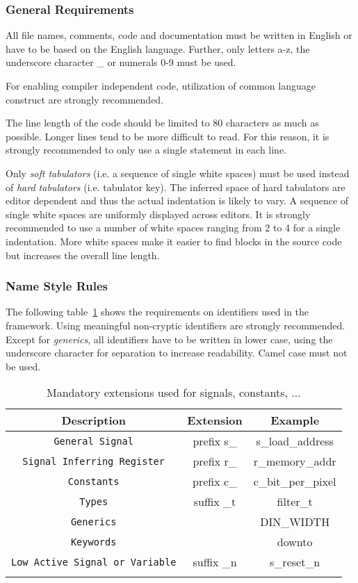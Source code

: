 \subsubsection{General Requirements}\label{VHDL-General-Requirements}
All file names, comments, code and documentation must be written in English or have to be based on the English language.
Further, only letters a-z, the underscore character \_ or numerals 0-9 must be used.

For enabling compiler independent code, utilization of common language construct are strongly recommended.


The line length of the code should be limited to 80 characters as much as possible.
Longer lines tend to be more difficult to read.
For this reason, it is strongly recommended to only use a single statement in each line.

Only \textit{soft tabulators} (i.e. a sequence of single white spaces) must be used instead of \textit{hard tabulators} (i.e. tabulator key).
The inferred space of hard tabulators are editor dependent and thus the actual indentation is likely to vary.
A sequence of single white spaces are uniformly displayed across editors.
It is strongly recommended to use a number of white spaces ranging from 2 to 4 for a single indentation.
More white spaces make it easier to find blocks in the source code but increases the overall line length. 

\subsubsection{Name Style Rules}\label{VHDL-Name-Style}

The following table~\ref{Mandatory_Identifier} shows the requirements on identifiers used in the \asterics framework.
Using meaningful non-cryptic identifiers are strongly recommended.
Except for \textit{generics}, all identifiers have to be written in lower case, using the underscore character for separation to increase readability.
Camel case must not be used. 

\begin{longtable}[ht]{|c|c|c|}
\hline 
\textbf{Description} & \textbf{Extension} & \textbf{Example}\\
\hline
\hline
\endhead

\texttt{General Signal} & prefix s\_ & s\_load\_address \\
\hline
\texttt{Signal Inferring Register} & prefix r\_ & r\_memory\_addr \\
\hline
\texttt{Constants} & prefix c\_ & c\_bit\_per\_pixel \\
\hline
\texttt{Types} & suffix \_t & filter\_t \\
\hline 
\texttt{Generics} &  & DIN\_WIDTH \\
\hline 
\texttt{Keywords} &  & downto \\
\hline 
\texttt{Low Active Signal or Variable} & suffix \_n & s\_reset\_n \\
\hline 
\caption{Mandatory extensions used for signals, constants, ...}\label{Mandatory_Identifier}
\end{longtable}

